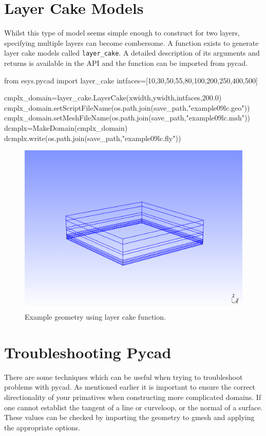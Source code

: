 \section{Layer Cake Models}
Whilst this type of model seems simple enough to construct for two layers,
specifying multiple layers can become combersome. A function exists to generate
layer cake models called \verb!layer_cake!. A detailed description of its
arguments and returns is available in the API and the function can be imported
from pycad.
\begin{python}
from esys.pycad import layer_cake
intfaces=[10,30,50,55,80,100,200,250,400,500]

cmplx_domain=layer_cake.LayerCake(xwidth,ywidth,intfaces,200.0)
cmplx_domain.setScriptFileName(os.path.join(save_path,"example09lc.geo"))
cmplx_domain.setMeshFileName(os.path.join(save_path,"example09lc.msh"))
dcmplx=MakeDomain(cmplx_domain)
dcmplx.write(os.path.join(save_path,"example09lc.fly"))
\end{python}

\begin{figure}[ht]
\begin{center}
\includegraphics[width=5in]{figures/gmsh/example09lc.png}
\caption{Example geometry using layer cake function.}
\label{fig:gmsh3dlc}
\end{center}
\end{figure}
\clearpage
\section{Troubleshooting Pycad}
There are some techniques which can be useful when trying to troubleshoot
problems with pycad. As mentioned earlier it is important to ensure the correct
directionality of your primatives when constructing more complicated domains. If
one cannot establist the tangent of a line or curveloop, or the normal of a
surface. These values can be checked by importing the geometry to gmesh and
applying the appropriate options.
